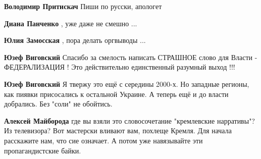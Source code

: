 \begin{itemize}
\textbf{Володимир Притискач} Пиши по русски, апологет

 
\textbf{Диана Панченко} , уже даже не смешно ...

 
\textbf{Юлия Замосская} , пора делать оргвыводы ...

 
\textbf{Юзеф Виговский} Спасибо за смелость написать СТРАШНОЕ слово для Власти
- ФЕДЕРАЛИЗАЦИЯ ! Это действительно единственный разумный выход !!!

 
\textbf{Юзеф Виговский} Я твержу это ещё с середины 2000-х. Но западные
регионы, как пиявки присосались к остальной Украине. А теперь ещё и до власти
добрались. Без "соли" не обойтись.

 
\textbf{Алексей Майборода} где вы взяли это словосочетание "кремлевские
нарративы"? Из телевизора? Вот мастерски вливают вам, похлеще Кремля. Для
начала расскажите нам, что сие означает. А потом уже навязывайте эти
пропагандистские байки.

 


\end{itemize}
